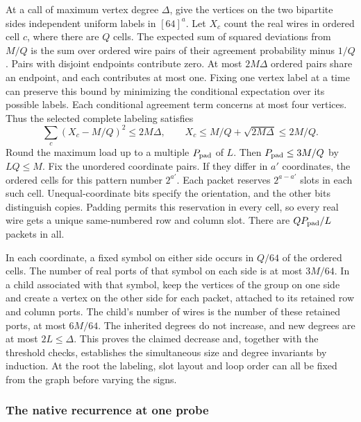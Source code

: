 \documentclass[
  11pt,
]{article}
\begin{document}
At a call of maximum vertex degree \(\Delta\), give the vertices on
the two bipartite sides independent uniform labels in \([64]^a\).
Let \(X_c\) count the real wires in ordered cell \(c\), where
there are \(Q\) cells. The expected sum of squared deviations from
\(M/Q\) is the sum over ordered wire pairs of their agreement
probability minus \(1/Q\). Pairs with disjoint endpoints contribute
zero. At most \(2M\Delta\) ordered pairs share an endpoint, and
each contributes at most one. Fixing one vertex label at a time
can preserve this bound by minimizing the conditional expectation
over its possible labels. Each conditional agreement term concerns
at most four vertices. Thus the selected complete labeling satisfies
\[
    \sum_c (X_c-M/Q)^2\le 2M\Delta,
       \qquad X_c\le M/Q+\sqrt{2M\Delta}\le 2M/Q .
\]
Round the maximum load up to a multiple \(P_{\rm pad}\) of \(L\).
Then \(P_{\rm pad}\le3M/Q\) by \(LQ\le M\).
Fix the unordered coordinate pairs. If they differ in \(a'\)
coordinates, the ordered cells for this pattern number \(2^{a'}\).
Each packet reserves \(2^{a-a'}\) slots in each such cell.
Unequal-coordinate bits specify the orientation, and the other
bits distinguish copies. Padding permits this reservation in
every cell, so every real wire gets a unique same-numbered row and
column slot. There are \(Q P_{\rm pad}/L\) packets in all.

In each coordinate, a fixed symbol on either side occurs in \(Q/64\)
of the ordered cells. The number of real ports of that symbol on
each side is at most \(3M/64\). In a child associated with that
symbol, keep the vertices of the group on one side and create a
vertex on the other side for each packet, attached to its retained
row and column ports. The child's number of wires is the number of
these retained ports, at most \(6M/64\). The inherited degrees do
not increase, and new degrees are at most \(2L\le\Delta\).
This proves the claimed decrease and, together with the threshold
checks, establishes the simultaneous size and degree invariants by
induction. At the root the labeling, slot layout and loop order can
all be fixed from the graph before varying the signs.

\subsubsection*{The native recurrence at one probe}
\end{document}
